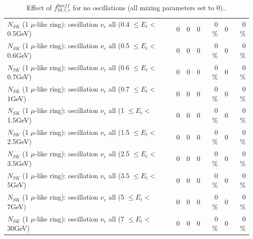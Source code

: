 \begin{table}
\begin{tabular}{| l | r | r | r  r | r  r |}
$N_{SK}$ (1 $\mu$-like ring): oscillation $\nu_{e}$ all (0.4 $\leq E_{t} <$ 0.5GeV) &               0 &               0 &               0 &        0 \%  &               0 &        0 \%  \\ 
$N_{SK}$ (1 $\mu$-like ring): oscillation $\nu_{e}$ all (0.5 $\leq E_{t} <$ 0.6GeV) &               0 &               0 &               0 &        0 \%  &               0 &        0 \%  \\ 
$N_{SK}$ (1 $\mu$-like ring): oscillation $\nu_{e}$ all (0.6 $\leq E_{t} <$ 0.7GeV) &               0 &               0 &               0 &        0 \%  &               0 &        0 \%  \\ 
$N_{SK}$ (1 $\mu$-like ring): oscillation $\nu_{e}$ all (0.7 $\leq E_{t} <$ 1GeV) &               0 &               0 &               0 &        0 \%  &               0 &        0 \%  \\ 
$N_{SK}$ (1 $\mu$-like ring): oscillation $\nu_{e}$ all (1 $\leq E_{t} <$ 1.5GeV) &               0 &               0 &               0 &        0 \%  &               0 &        0 \%  \\ 
$N_{SK}$ (1 $\mu$-like ring): oscillation $\nu_{e}$ all (1.5 $\leq E_{t} <$ 2.5GeV) &               0 &               0 &               0 &        0 \%  &               0 &        0 \%  \\ 
$N_{SK}$ (1 $\mu$-like ring): oscillation $\nu_{e}$ all (2.5 $\leq E_{t} <$ 3.5GeV) &               0 &               0 &               0 &        0 \%  &               0 &        0 \%  \\ 
$N_{SK}$ (1 $\mu$-like ring): oscillation $\nu_{e}$ all (3.5 $\leq E_{t} <$ 5GeV) &               0 &               0 &               0 &        0 \%  &               0 &        0 \%  \\ 
 $N_{SK}$ (1 $\mu$-like ring): oscillation $\nu_{e}$ all (5 $\leq E_{t} <$ 7GeV) &               0 &               0 &               0 &        0 \%  &               0 &        0 \%  \\ 
$N_{SK}$ (1 $\mu$-like ring): oscillation $\nu_{e}$ all (7 $\leq E_{t} <$ 30GeV) &               0 &               0 &               0 &        0 \%  &               0 &        0 \%  \\ 
\hline
\hline
\end{tabular}
\caption{ Effect of $f_{10; t, r}^{banff}$ for no oscillations (all mixing parameters set to 0).. }
\label{tab:num_banff_10_1RmuT_3f_osc_t13:0}
\end{table}
\clearpage
